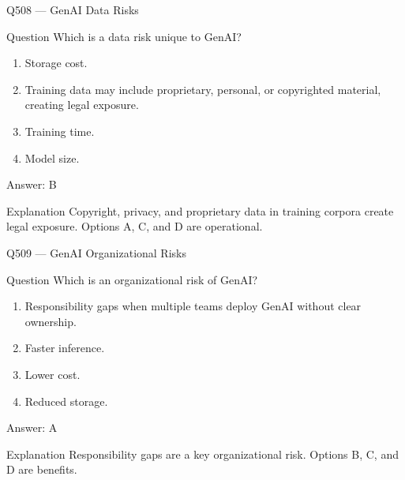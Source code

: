 \documentclass[aspectratio=169,8pt]{beamer}
\begin{document}
	\begin{frame}{Q508 --- GenAI Data Risks}
		\begin{block}{Question}
			Which is a data risk unique to GenAI?
			\begin{enumerate}
				\item Storage cost.
				\item Training data may include proprietary, personal, or copyrighted material, creating legal exposure.
				\item Training time.
				\item Model size.
			\end{enumerate}
		\end{block}
		\begin{exampleblock}{Answer: B}\end{exampleblock}
		\begin{block}{Explanation}
			Copyright, privacy, and proprietary data in training corpora create legal exposure. Options A, C, and D are operational.
		\end{block}
	\end{frame}
	
	\begin{frame}{Q509 --- GenAI Organizational Risks}
		\begin{block}{Question}
			Which is an organizational risk of GenAI?
			\begin{enumerate}
				\item Responsibility gaps when multiple teams deploy GenAI without clear ownership.
				\item Faster inference.
				\item Lower cost.
				\item Reduced storage.
			\end{enumerate}
		\end{block}
		\begin{exampleblock}{Answer: A}\end{exampleblock}
		\begin{block}{Explanation}
			Responsibility gaps are a key organizational risk. Options B, C, and D are benefits.
		\end{block}
	\end{frame}
	
\end{document}
